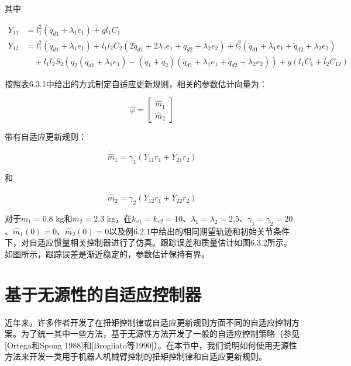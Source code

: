 \documentclass[12pt,a4paper]{ctexart}
\begin{document}
其中

\begin{align}
Y_{11} &= l_1^2(\ddot{q}_{d1} + \lambda_1\dot{e}_1) + g l_1 C_1 \\
Y_{12} &= l_1^2(\ddot{q}_{d1} + \lambda_1\dot{e}_1) + l_1 l_2 C_2(2\ddot{q}_{d1} + 2\lambda_1\dot{e}_1 + \ddot{q}_{d2} + \lambda_2\dot{e}_2) + l_2^2(\ddot{q}_{d1} + \lambda_1\dot{e}_1 + \ddot{q}_{d2} + \lambda_2\dot{e}_2) \\
&\quad + l_1 l_2 S_2(\dot{q}_2(\dot{q}_{d1} + \lambda_1 e_1) - (\dot{q}_1 + \dot{q}_2)(\dot{q}_{d1} + \lambda_1 e_1 + \dot{q}_{d2} + \lambda_2 e_2)) + g(l_1 C_1 + l_2 C_{12})
\end{align}

按照表6.3.1中给出的方式制定自适应更新规则，相关的参数估计向量为：

\begin{equation}
\hat{\varphi} = \begin{bmatrix} \hat{m}_1 \\ \hat{m}_2 \end{bmatrix}
\end{equation}

带有自适应更新规则：

\begin{equation}
\dot{\hat{m}}_1 = \gamma_1(Y_{11}r_1 + Y_{21}r_2)
\end{equation}

和

\begin{equation}
\dot{\hat{m}}_2 = \gamma_2(Y_{12}r_1 + Y_{22}r_2)
\end{equation}

对于$m_1 = 0.8$ kg和$m_2 = 2.3$ kg，在$k_{v1} = k_{v2} = 10$、$\lambda_1 = \lambda_2 = 2.5$、$\gamma_1 = \gamma_2 = 20$、$\hat{m}_1(0) = 0$、$\hat{m}_2(0) = 0$以及例6.2.1中给出的相同期望轨迹和初始关节条件下，对自适应惯量相关控制器进行了仿真。跟踪误差和质量估计如图6.3.2所示。如图所示，跟踪误差是渐近稳定的，参数估计保持有界。

\section{基于无源性的自适应控制器}\label{sec:passivity}

近年来，许多作者开发了在扭矩控制律或自适应更新规则方面不同的自适应控制方案。为了统一其中一些方法，基于无源性方法开发了一般的自适应控制策略（参见[Ortega和Spong 1988]和[Brogliato等1990]）。在本节中，我们说明如何使用无源性方法来开发一类用于机器人机械臂控制的扭矩控制律和自适应更新规则。
\end{document}
